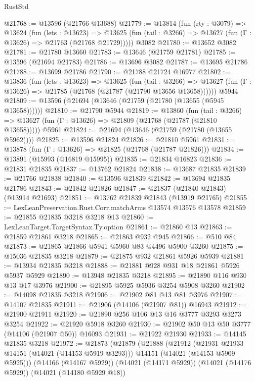 \begin{lexlean}{RustStd}
\begin{coremodule}
@21768 := @13596 (@21766 @13688)
@21779 := @13814
    (fun (rty : @3079) =>
    @13624
      (fun (lets : @13623) =>
      @13625 (fun (tail : @3266) => @13627 (fun (Γ : @13626) => @21763 (@21768 @21729)))))
    @3082
@21780 := @13652 @3082
@21781 := @21780 @13660
@21783 := @13646 (@21759 @21781)
@21785 := @13596 (@21694 @21783)
@21786 := @13696 @3082
@21787 := @13695 @21786
@21788 := @13699 @21786
@21790 := @21788 @21724 @16977
@21802 := @13836
    (fun (lets : @13623) =>
    @13625
      (fun (tail : @3266) =>
      @13627 (fun (Γ : @13626) => @21785 (@21768 (@21787 (@21790 @13656 @13658))))))
    @5944
@21809 := @13596 (@21694 (@13646 (@21759 (@21780 (@13655 (@5945 @13658))))))
@21810 := @21790 @5944
@21819 := @13860
    (fun (tail : @3266) => @13627 (fun (Γ : @13626) => @21809 (@21768 (@21787 (@21810 @13658)))))
    @5961
@21824 := @21694 (@13646 (@21759 (@21780 (@13655 @5962))))
@21825 := @13596 @21824
@21826 := @21810 @5961
@21831 := @13878 (fun (Γ : @13626) => @21825 (@21768 (@21787 @21826)))
@21834 := @13891 (@15993 (@16819 @15995))
@21835 := @21834 @16823
@21836 := @21831 @21835
@21837 := @13762 @21824
@21838 := @13687 @21835
@21839 := @21766 @21838
@21840 := @13596 @21839
@21842 := @13694 @21835 @21786
@21843 := @21842 @21826
@21847 := @21837 (@21840 @21843) (@13914 @21693)
@21851 := @13762 @21839 @21843 (@13919 @21765)
@21855 := LexLeanPreservation.Rust.Corr.matchArms @13574 @13576 @13578
@21859 := @21855 @21835 @3218 @3218 @13
@21860 := LexLeanTarget.TargetSyntax.Ty.option
@21861 := @21860 @13
@21863 := @21859 @21861 @3218
@21865 := @21863 @932 @945
@21866 := @510 @84
@21873 := @21865 @21866 @5941 @5960 @83 @4496 @5900 @3260
@21875 := @15036 @21835 @3218
@21879 := @21875 @932 @21861 @5926 @5939
@21881 := @13934 @21835 @3218
@21888 := @21881 @928 @931 @18 @21861 @5926 @5937 @5929
@21890 := @13948 @21835 @3218
@21895 := @21890 @116 @930 @13 @17 @3976
@21900 := @21895 @5925 @5936 @3254 @5908 @3260
@21902 := @14098 @21835 @3218
@21906 := @21902 @81 @13 @81 @3976
@21907 := @14107 @21835
@21911 := @21906 (@14106 (@21907 @81)) @16943
@21912 := @21900 @21911
@21920 := @21890 @256 @106 @13 @16 @3777 @3293 @3273 @3254
@21922 := @21920 @5918 @3260
@21930 := @21902 @50 @13 @50 @3777 (@14106 (@21907 @50)) @16093
@21931 := @21922 @21930
@21933 := @14145 @21835 @3218
@21972 := @21873
    (@21879
      (@21888
        (@21912
          (@21931 @21933 @14151 (@14021 (@14153 @5919 @3293)))
          @14151
          (@14021 (@14153 @5909 @5925)))
        (@14166 (@14167 @5929))
        (@14021 (@14171 @5929))
        (@14021 (@14176 @5929))
        (@14021 (@14180 @5929 @18))

\end{coremodule}
\end{lexlean}
